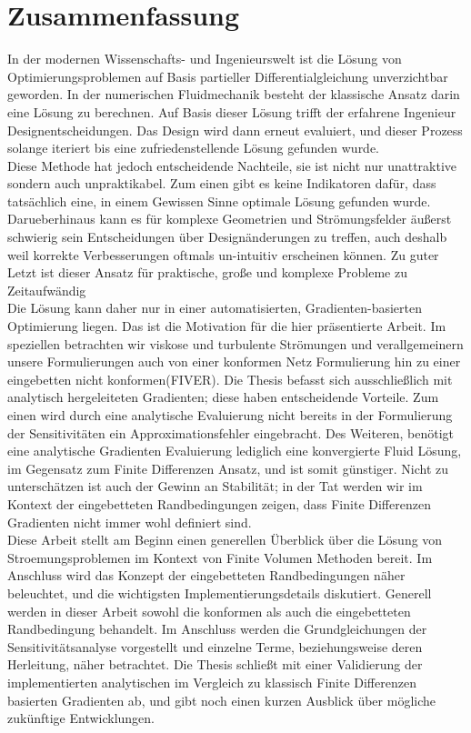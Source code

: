 \newpage

\section*{Zusammenfassung}
In der modernen Wissenschafts- und Ingenieurswelt ist die Lösung von Optimierungsproblemen auf Basis partieller Differentialgleichung unverzichtbar geworden.
In der numerischen Fluidmechanik besteht der klassische Ansatz darin eine Lösung zu berechnen. Auf Basis dieser Lösung trifft der erfahrene Ingenieur Designentscheidungen. Das Design wird dann erneut evaluiert, und dieser Prozess solange iteriert bis eine zufriedenstellende L\"osung gefunden wurde.\\
Diese Methode hat jedoch entscheidende Nachteile, sie ist nicht nur unattraktive sondern auch unpraktikabel. Zum einen gibt es keine Indikatoren dafür, dass tats\"achlich eine, in einem Gewissen Sinne optimale L\"osung gefunden wurde. Darueberhinaus kann es für komplexe Geometrien und Str\"omungsfelder \"außerst schwierig sein Entscheidungen über Design\"anderungen zu treffen, auch deshalb weil korrekte Verbesserungen oftmals un-intuitiv erscheinen k\"onnen. Zu guter Letzt ist dieser Ansatz für praktische, große und komplexe Probleme zu Zeitaufw\"andig\\
Die L\"osung kann daher nur in einer automatisierten, Gradienten-basierten Optimierung liegen. Das ist die Motivation f\"ur die hier pr\"asentierte Arbeit. Im speziellen betrachten wir viskose und turbulente Str\"omungen und verallgemeinern unsere Formulierungen auch von einer konformen Netz Formulierung hin zu einer eingebetten nicht konformen(FIVER). Die Thesis befasst sich ausschließlich mit analytisch hergeleiteten Gradienten; diese haben entscheidende Vorteile. Zum einen wird durch eine analytische Evaluierung nicht bereits in der Formulierung der Sensitivit\"aten ein Approximationsfehler eingebracht. Des Weiteren, ben\"otigt eine analytische Gradienten Evaluierung lediglich eine konvergierte Fluid L\"osung, im Gegensatz zum Finite Differenzen Ansatz, und ist somit günstiger. Nicht zu untersch\"atzen ist auch der Gewinn an Stabilit\"at; in der Tat werden wir im Kontext der eingebetteten Randbedingungen zeigen, dass Finite Differenzen Gradienten nicht immer wohl definiert sind.\\
Diese Arbeit stellt am Beginn einen generellen Überblick über die L\"osung von Stroemungsproblemen im Kontext von Finite Volumen Methoden bereit. Im Anschluss wird das Konzept der eingebetteten Randbedingungen n\"aher beleuchtet, und die wichtigsten Implementierungsdetails diskutiert. Generell werden in dieser Arbeit sowohl die konformen als auch die eingebetteten Randbedingung behandelt. Im Anschluss werden die Grundgleichungen der Sensitivit\"atsanalyse vorgestellt und einzelne Terme, beziehungsweise deren Herleitung, n\"aher betrachtet. Die Thesis schließt mit einer Validierung der implementierten analytischen im Vergleich zu klassisch Finite Differenzen basierten Gradienten ab, und gibt noch einen kurzen Ausblick über m\"ogliche zukünftige Entwicklungen.

